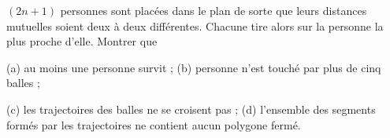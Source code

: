 $(2n + 1)$ personnes sont placées dans le plan de sorte que leurs distances mutuelles soient deux à deux différentes. Chacune tire alors sur la personne la plus proche d'elle. Montrer que

(a) au moins une personne survit ; (b) personne n'est touché par plus de cinq balles ;

(c) les trajectoires des balles ne se croisent pas ; (d) l'ensemble des segments formés par les trajectoires ne contient aucun polygone fermé.
